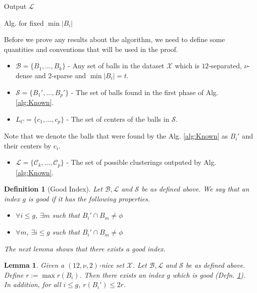 \documentclass[twoside]{article}
\newcommand{\mc}{\mathcal}
\newtheorem{definition}[theorem]{Definition}
\newtheorem{lemma}[theorem]{Lemma}
\newenvironment{alg}{
    \begin{list}{}{
        \setlength{\itemsep}{2pt}
        \setlength{\parsep}{0pt}
        \setlength{\parskip}{0pt}
        \setlength{\topsep}{1pt}
    }
}
{
    \end{list}
}
\begin{document}
\begin{algorithm}
\begin{alg}
\begin{itemize}
\end{itemize}
\item[] Output $\mc L$ %
\label{alg:Known}
\end{alg}
\caption{Alg. for fixed $\min|B_i|$}
\end{algorithm}

Before we prove any results about the algorithm, we need to define some quantities and conventions that will be used in the proof.
\begin{itemize}[nolistsep,noitemsep]
\item $\mc B = \{B_1, \ldots, B_k\}$ - Any set of balls in the dataset $\mc X$ which is $12$-separated, $\nu$-dense and $2$-sparse and $\min |B_i| = t$.
\item $\mc S = \{B_1', \ldots, B_p'\}$ - The set of balls found in the first phase of Alg. \ref{alg:Known}. 
\item $L_C = \{c_1, \ldots, c_p\}$ - The set of centers of the balls in $\mc S$.  
\end{itemize}
Note that we denote the balls that were found by the Alg. \ref{alg:Known} as $B_i'$ and their centers by $c_i$. 
\begin{itemize}[nolistsep,noitemsep]
\item $\mc L = \{\mc C_k, \ldots, \mc C_p\}$ - The set of possible clusterings outputed by Alg. \ref{alg:Known}. 
\end{itemize}

\begin{definition}[Good Index]
\label{defn:goodIdx}
Let $\mc B, \mc L$ and $\mc S$ be as defined above. We say that an index $g$ is good if it has the following properties.
\begin{itemize}[nolistsep,noitemsep]
\item $\forall i \le g$, $\exists m$ such that $B_i' \cap B_m \neq \phi$
\item $\forall m$, $\exists i \le g$ such that $B_i' \cap B_m \neq \phi$
\end{itemize}
The next lemma shows that there exists a good index.
\end{definition}

\begin{lemma}
Given a $(12,\nu,2)$-nice set $\mc X$. Let $\mc B, \mc L$ and $\mc S$ be as defined above. Define $r:= \max r(B_i)$. Then there exists an index $g$ which is good (Defn. \ref{defn:goodIdx}). In addition, for all $i\le g$, $r(B_i') \le 2r$.
\label{lemma:goodIdx}
\end{lemma}
\end{document}
